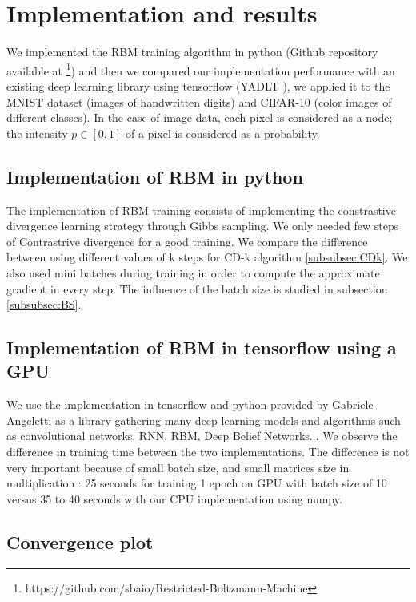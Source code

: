\documentclass{article}
\begin{document}
\clearpage
\section{Implementation and results}

We implemented the RBM training algorithm in python (Github repository available at \footnote{https://github.com/sbaio/Restricted-Boltzmann-Machine}) and then we compared our implementation performance with an existing deep learning library using tensorflow (YADLT \cite{yadltGithub}), we applied it to the MNIST dataset (images of handwritten digits) and CIFAR-10 (color images of different classes). In the case of image data, each pixel is considered as a node; the intensity $p \in [0,1]$ of a pixel is considered as a probability. \\

\subsection{Implementation of RBM in python}

The implementation of RBM training consists of implementing the constrastive divergence learning strategy through Gibbs sampling. We only needed few steps of Contrastrive divergence for a good training. We compare the difference between using different values of k steps for CD-k algorithm \ref{subsubsec:CDk}.
We also used mini batches during training in order to compute the approximate gradient in every step. The influence of the batch size is studied in subsection \ref{subsubsec:BS}.

\subsection{Implementation of RBM in tensorflow using a GPU}

We use the implementation in tensorflow and python provided by Gabriele Angeletti as a library gathering many deep learning models and algorithms such as convolutional networks, RNN, RBM, Deep Belief Networks... We observe the difference in training time between the two implementations. The difference is not very important because of small batch size, and small matrices size in multiplication \cite{fatahalian2004understanding}: 25 seconds for training 1 epoch on GPU with batch size of 10 versus 35 to 40 seconds with our CPU implementation using numpy. 

\subsection{Convergence plot}
\end{document}
